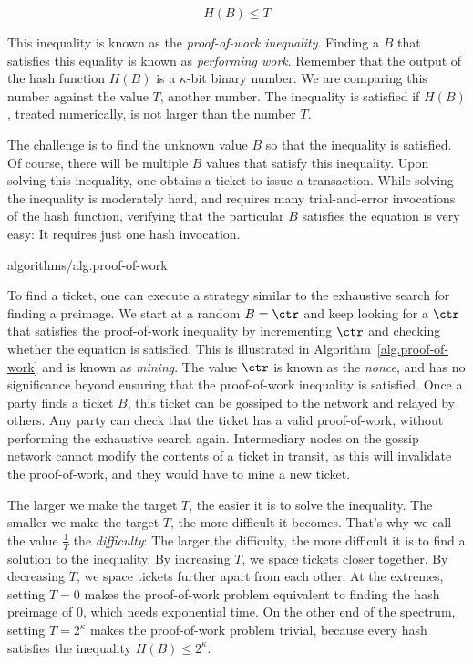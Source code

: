 \[
    H(B) \leq T
\]

This inequality is known as the \emph{proof-of-work inequality}. Finding
a $B$ that satisfies this equality is known as \emph{performing work}.
Remember
that the output of the hash function $H(B)$ is a $\kappa$-bit binary number. We are comparing
this number against the value $T$, another number. The inequality is satisfied if $H(B)$, treated
numerically, is not larger than the number $T$.

The challenge is to find the unknown value $B$ so that the inequality is satisfied. Of course,
there will be multiple $B$ values that satisfy this inequality. Upon solving this inequality,
one obtains a ticket to issue a transaction. While solving the inequality is moderately hard,
and requires many trial-and-error invocations of the hash function, verifying that the particular
$B$ satisfies the equation is very easy: It requires just one hash invocation.

{algorithms/alg.proof-of-work}

To find a ticket, one can execute a strategy similar to the exhaustive search for finding a
preimage. We start at a random $B = \ctr$ and keep looking for a $\ctr$ that satisfies the
proof-of-work inequality by incrementing $\ctr$ and checking whether the equation is satisfied.
This is illustrated in Algorithm~\ref{alg.proof-of-work} and is known
as \emph{mining}. The value $\ctr$ is known as the
\emph{nonce},
and has no significance beyond ensuring that the proof-of-work inequality is satisfied.
Once a party finds a ticket $B$, this ticket can be gossiped
to the network and relayed by others. Any party can check that the ticket has a valid proof-of-work,
without performing the exhaustive search again. Intermediary nodes on the gossip network cannot
modify the contents of a ticket in transit, as this will invalidate the proof-of-work, and they
would have to mine a new ticket.

The larger we make the target $T$, the easier it is to solve the inequality. The smaller we make
the target $T$, the more difficult it becomes. That's why we call the value $\frac{1}{T}$ the
\emph{difficulty}: The larger the difficulty, the more difficult it is to
find a solution to the inequality. By increasing $T$, we space tickets closer together.
By decreasing $T$, we space tickets further apart from each other. At the extremes,
setting $T = 0$ makes the proof-of-work problem equivalent to finding the hash preimage of
$0$, which needs exponential time. On the other end of the spectrum, setting $T = 2^\kappa$
makes the proof-of-work problem trivial, because every hash satisfies the inequality
$H(B) \leq 2^\kappa$.

